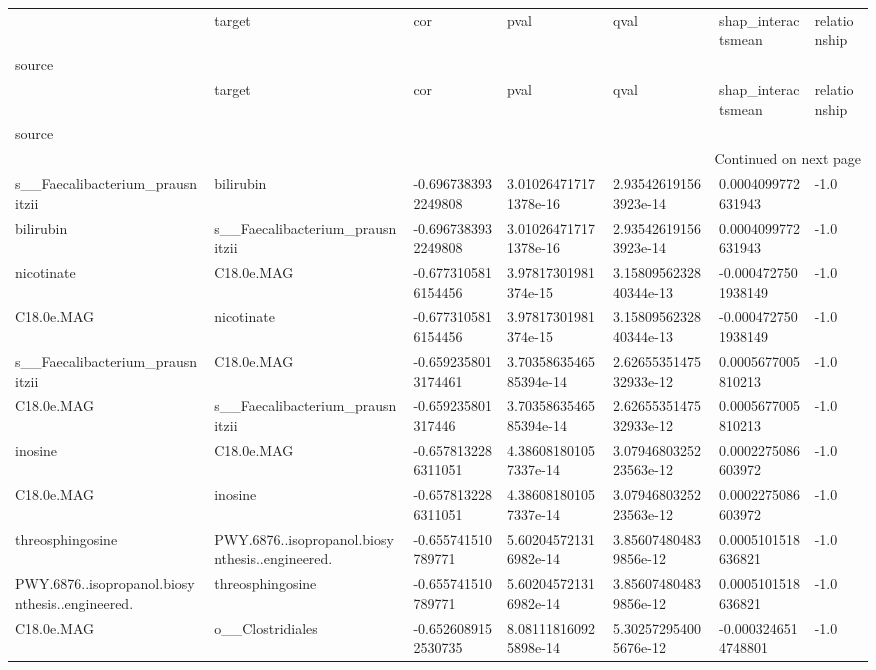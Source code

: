 \begin{longtable}{lllllll}
\toprule
 & target & cor & pval & qval & shap\_interactsmean & relationship \\
source &  &  &  &  &  &  \\
\midrule
\endfirsthead
\toprule
 & target & cor & pval & qval & shap\_interactsmean & relationship \\
source &  &  &  &  &  &  \\
\midrule
\endhead
\midrule
\multicolumn{7}{r}{Continued on next page} \\
\midrule
\endfoot
\bottomrule
\endlastfoot
s\_\_Faecalibacterium\_prausnitzii & bilirubin & -0.6967383932249808 & 3.010264717171378e-16 & 2.935426191563923e-14 & 0.0004099772631943 & -1.0 \\
bilirubin & s\_\_Faecalibacterium\_prausnitzii & -0.6967383932249808 & 3.010264717171378e-16 & 2.935426191563923e-14 & 0.0004099772631943 & -1.0 \\
nicotinate & C18.0e.MAG & -0.6773105816154456 & 3.97817301981374e-15 & 3.1580956232840344e-13 & -0.0004727501938149 & -1.0 \\
C18.0e.MAG & nicotinate & -0.6773105816154456 & 3.97817301981374e-15 & 3.1580956232840344e-13 & -0.0004727501938149 & -1.0 \\
s\_\_Faecalibacterium\_prausnitzii & C18.0e.MAG & -0.6592358013174461 & 3.7035863546585394e-14 & 2.6265535147532933e-12 & 0.0005677005810213 & -1.0 \\
C18.0e.MAG & s\_\_Faecalibacterium\_prausnitzii & -0.659235801317446 & 3.7035863546585394e-14 & 2.6265535147532933e-12 & 0.0005677005810213 & -1.0 \\
inosine & C18.0e.MAG & -0.6578132286311051 & 4.386081801057337e-14 & 3.0794680325223563e-12 & 0.0002275086603972 & -1.0 \\
C18.0e.MAG & inosine & -0.6578132286311051 & 4.386081801057337e-14 & 3.0794680325223563e-12 & 0.0002275086603972 & -1.0 \\
threosphingosine & PWY.6876..isopropanol.biosynthesis..engineered. & -0.655741510789771 & 5.602045721316982e-14 & 3.856074804839856e-12 & 0.0005101518636821 & -1.0 \\
PWY.6876..isopropanol.biosynthesis..engineered. & threosphingosine & -0.655741510789771 & 5.602045721316982e-14 & 3.856074804839856e-12 & 0.0005101518636821 & -1.0 \\
C18.0e.MAG & o\_\_Clostridiales & -0.6526089152530735 & 8.081118160925898e-14 & 5.302572954005676e-12 & -0.0003246514748801 & -1.0 \\

\end{longtable}
